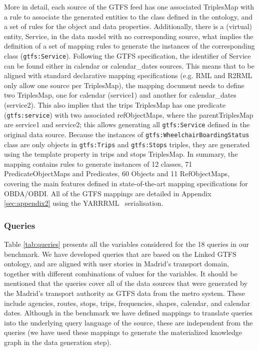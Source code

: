 More in detail, each source of the GTFS feed has one associated TriplesMap with a rule to associate the generated entities to the class defined in the ontology, and a set of rules for the object and data properties. Additionally, there is a (virtual) entity, Service, in the data model with no corresponding source, what implies the definition of a set of mapping rules to generate the instances of the corresponding class (\texttt{gtfs:Service}). Following the GTFS specification, the identifier of Service can be found either in calendar or calendar\_dates sources. This means that to be aligned with standard declarative mapping specifications (e.g. RML and R2RML only allow one source per TriplesMap), the mapping document needs to define two TriplesMap, one for calendar (service1) and another for calendar\_dates (service2). This also implies that the trips TriplesMap has one predicate (\texttt{gtfs:service}) with two associated refObjectMaps, where the parentTriplesMap are service1 and service2; this allows generating all \texttt{gtfs:Service} defined in the original data source. Because the instances of \texttt{gtfs:WheelchairBoardingStatus} class are only objects in \texttt{gtfs:Trips} and \texttt{gtfs:Stops} triples, they are generated using the template property in trips and stops TriplesMap. In summary, the mapping contains rules to generate instances of 12 classes, 71 PredicateObjectMaps and Predicates, 60 Objects and 11 RefObjectMaps, covering the main features defined in state-of-the-art mapping specifications for OBDA/OBDI. All of the GTFS mappings are detailed in Appendix \ref{sec:appendix2} using the YARRRML~\citep{Heyvaert2018Declarative} serialisation.

\subsubsection{Queries}
Table \ref{tab:queries} presents all the variables considered for the 18 queries in our benchmark. We have developed queries that are based on the Linked GTFS ontology, and are aligned with user stories in Madrid's transport domain, together with different combinations of values for the variables. It should be mentioned that the queries cover all of the data sources that were generated by the Madrid's transport authority as GTFS data from the metro system. These include agencies, routes, stops, trips, frequencies, shapes, calendar, and calendar dates. Although in the benchmark we have defined mappings to translate queries into the underlying query language of the source, these are independent from the queries (we have used these mappings to generate the materialized knowledge graph in the data generation step).

